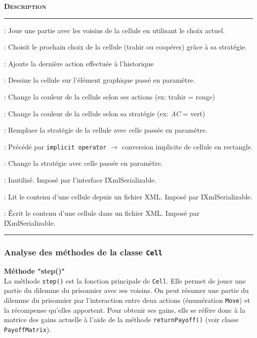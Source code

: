 \documentclass[a4paper, french]{article}
\begin{document}
\vspace{0.25cm}
\begin{description}[labelwidth=3.85cm]
    \small
    \item[\textbf{\textsc{Méthode}}] \textbf{\textsc{Description}}
    \vspace{0.1cm}
    \hrule{}
    \item[\texttt{step()}]                  :   Joue une partie avec les voisins de la cellule en utilisant le choix actuel.
    \item[\texttt{chooseNextMove()}]        :   Choisit le prochain choix de la cellule (trahir ou coopérer) grâce à sa stratégie.
    \item[\texttt{updateLastMove()}]        :   Ajoute la dernière action effectuée à l'historique 
    \item[\texttt{draw()}]                  :   Dessine la cellule sur l'élément graphique passé en paramètre.
    \item[\texttt{setColorFromMove()}]      :   Change la couleur de la cellule selon ses actions (ex: trahir = rouge)
    \item[\texttt{setColorFromStrategy()}]  :   Change la couleur de la cellule selon sa stratégie (ex: \textit{AC} = vert)
    \item[\texttt{updateStrategy()}]        :   Remplace la stratégie de la cellule avec celle passée en paramètre.
    \item[\texttt{Rectangle()}]             :   Précédé par \texttt{implicit operator} $\rightarrow$ conversion implicite de cellule en rectangle.
    \item[\texttt{onClick()}]               :   Change la stratégie avec celle passée en paramètre.
    \item[\texttt{GetSchema()}]             :   Inutilisé. Imposé par l'interface IXmlSerializable.
    \item[\texttt{ReadXml()}]               :   Lit le contenu d'une cellule depuis un fichier XML. Imposé par IXmlSerializable.
    \item[\texttt{WriteXml()}]              :   Écrit le contenu d'une cellule dans un fichier XML. Imposé par IXmlSerializable.
\end{description}
\hrule{}
\vspace{0.5cm}
\pagebreak

\subsubsection{Analyse des méthodes de la classe \texttt{Cell}}
\textbf{Méthode "step()"}\\
La méthode \texttt{step()} est la fonction principale de \texttt{Cell}. Elle permet de jouer une partie du dilemme du prisonnier avec ses voisins. On peut résumer une partie du dilemme du prisonnier par l'interaction entre deux actions (énumération \texttt{Move}) et la récompense qu'elles apportent. Pour obtenir ses gains, elle se réfère donc à la matrice des gains actuelle à l'aide de la méthode \texttt{returnPayoff()} (voir classe \texttt{PayoffMatrix}). 
\end{document}
